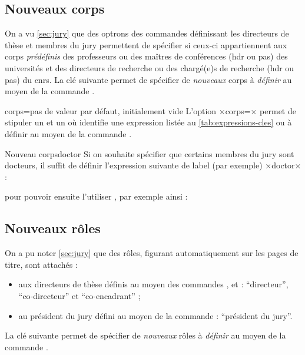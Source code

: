 \subsection{Nouveaux corps}\label{sec:nouveaux-corps}

On a vu \vref{sec:jury} que des optrons des commandes définissant les
directeurs de thèse et membres du jury permettent de spécifier si ceux-ci
appartiennent aux corps \emph{prédéfinis} des professeurs ou des maîtres de
conférences (\gls{hdr} ou pas) des universités et des directeurs de recherche
ou des chargé(e)s de recherche (\gls{hdr} ou pas) du \gls{cnrs}. La clé
 suivante permet de spécifier de \emph{nouveaux} corps
à \emph{définir} au moyen de la commande .

\begin{docKey}{corps}{=}{pas de
    valeur par défaut, initialement vide}
  L'option ×corps=× permet de stipuler un 
  et un  où  identifie une expression listée
  au \vref{tab:expressions-cles} ou à définir au moyen de la commande
  .
\end{docKey}

\begin{dbexample}{Nouveau corps}{doctor}
  Si on souhaite spécifier que certains membres du jury sont docteurs, il
  suffit de définir  l'expression suivante de label (par
  exemple) ×doctor× :
\begin{preamblecode}[title=Par exemple dans le \File{\configurationfile}]
\end{preamblecode}
  pour pouvoir ensuite l'utiliser , par
  exemple ainsi :
\begin{bodycode}
\end{bodycode}
\end{dbexample}

\subsection{Nouveaux rôles}\label{sec:nouveaux-roles}

On a pu noter \vref{sec:jury} que des rôles, figurant automatiquement sur les
pages de titre, sont attachés :
\begin{itemize}
\item aux directeurs de thèse définis au moyen des commandes
  ,  et  :
  \enquote{directeur}, \enquote{co-directeur} et \enquote{co-encadrant} ;
\item au président du jury défini au moyen de la commande
   : \enquote{président du jury}.
\end{itemize}
La clé  suivante permet de spécifier de \emph{nouveaux} rôles
à \emph{définir} au moyen de la commande .

